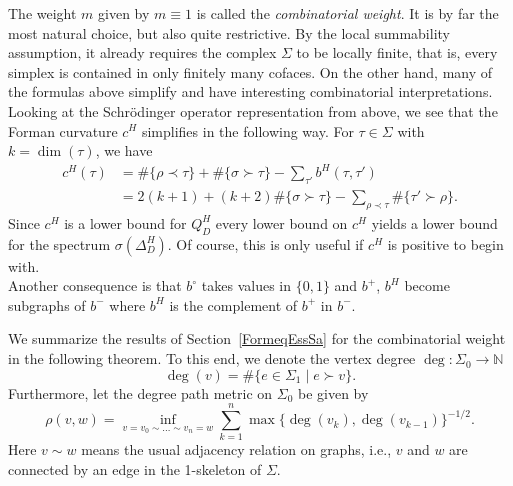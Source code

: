 \documentclass[10pt]{amsart}
\theoremstyle{definition}
\renewcommand{\bullet}{{\circ}}
\begin{document}
The weight $m$ given by $m\equiv 1$ is called the \textit{combinatorial weight}. It is by far the most natural choice, but also quite restrictive. By the local summability assumption, it already requires the complex $\Sigma$ to be locally finite, that is, every simplex is contained in only finitely many cofaces. On the other hand, many of the formulas above simplify and have interesting combinatorial interpretations. Looking at the Schr\"odinger operator representation from above, we see that the Forman curvature $c^H$ simplifies in the following way.
For $\tau\in\Sigma$ with $k = \dim(\tau)$, we have
\begin{align*}
	c^H(\tau) &= \#\lbrace\rho\prec\tau\rbrace+\#\lbrace\sigma\succ\tau\rbrace -\sum_{\tau'}b^H(\tau,\tau')\\
	& = 2(k+1)+(k+2)\#\lbrace\sigma\succ\tau\rbrace-\sum_{\rho\prec\tau}\#\lbrace \tau'\succ \rho\rbrace.
\end{align*}
Since $c^H$ is a lower bound for $Q_D^H$ every lower bound on $c^H$ yields a lower bound for the spectrum $\sigma(\Delta^H_D).$ Of course, this is only useful if $c^H$ is positive to begin with.\\
Another consequence is that $b^{\bullet}$ takes values in $\{0,1\}$
and $b^+$, $b^H$ become subgraphs of $b^-$ where $b^H$ is the complement of $b^+$ in $b^-.$


We summarize the results of Section~\ref{FormeqEssSa} for the combinatorial weight in the following theorem. To this end, we denote the vertex degree $\deg:\Sigma_{0}\to\mathbb{N}$
\begin{equation*}
	\deg(v)=\#\{e\in \Sigma_{1}\mid e\succ v\}.
\end{equation*}
Furthermore, let the degree path metric on $\Sigma_{0}$ be given by
\begin{equation*}
	\rho(v,w)=\inf_{v=v_{0}\sim\ldots\sim v_{n}=w}\sum_{k=1}^{n}\max\{\deg(v_{k}),\deg(v_{k-1})\}^{-1/2}.
\end{equation*}
Here $v\sim w$ means the usual adjacency relation on graphs, i.e., $v$ and $w$ are connected by an edge in the 1-skeleton of $\Sigma.$
\end{document}

